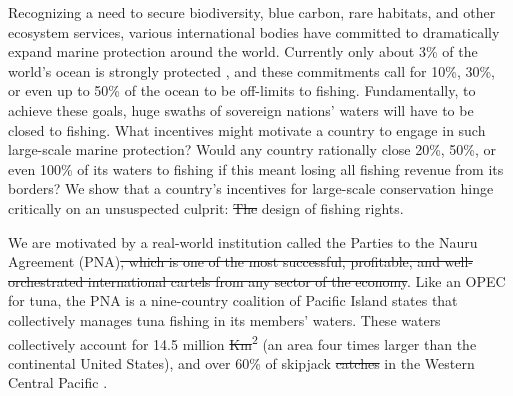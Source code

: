 \documentclass[12pt]{article}
\providecommand{\DIFaddtex}[1]{{\protect\color{blue}\uwave{#1}}} %
\providecommand{\DIFdeltex}[1]{{\protect\color{red}\sout{#1}}}                      %
\providecommand{\DIFaddbegin}{} %
\providecommand{\DIFaddend}{} %
\providecommand{\DIFdelbegin}{} %
\providecommand{\DIFdelend}{} %
\providecommand{\DIFadd}[1]{\texorpdfstring{\DIFaddtex{#1}}{#1}} %
\providecommand{\DIFdel}[1]{\texorpdfstring{\DIFdeltex{#1}}{}} %
\newcommand{\DIFscaledelfig}{0.5}
\newlength{\DIFdelgraphicswidth} %
\newlength{\DIFdelgraphicsheight} %
\newcommand{\DIFaddincludegraphics}[2][]{{\color{blue}\fbox{\DIFOincludegraphics[#1]{#2}}}} %
\newcommand{\DIFdelincludegraphics}[2][]{%
\sbox{\DIFdelgraphicsbox}{\DIFOincludegraphics[#1]{#2}}%
\settoboxwidth{\DIFdelgraphicswidth}{\DIFdelgraphicsbox} %
\settoboxtotalheight{\DIFdelgraphicsheight}{\DIFdelgraphicsbox} %
\scalebox{\DIFscaledelfig}{%
\parbox[b]{\DIFdelgraphicswidth}{\usebox{\DIFdelgraphicsbox}\\[-\baselineskip] \rule{\DIFdelgraphicswidth}{0em}}\llap{\resizebox{\DIFdelgraphicswidth}{\DIFdelgraphicsheight}{%
\setlength{\unitlength}{\DIFdelgraphicswidth}%
\begin{picture}(1,1)%
\thicklines\linethickness{2pt} %
{\color[rgb]{1,0,0}\put(0,0){\framebox(1,1){}}}%
{\color[rgb]{1,0,0}\put(0,0){\line( 1,1){1}}}%
{\color[rgb]{1,0,0}\put(0,1){\line(1,-1){1}}}%
\end{picture}%
}\hspace*{3pt}}} %
} %
\DeclareRobustCommand{\DIFaddbegin}{\DIFOaddbegin \let\includegraphics\DIFaddincludegraphics} %
\DeclareRobustCommand{\DIFaddend}{\DIFOaddend \let\includegraphics\DIFOincludegraphics} %
\DeclareRobustCommand{\DIFdelbegin}{\DIFOdelbegin \let\includegraphics\DIFdelincludegraphics} %
\DeclareRobustCommand{\DIFdelend}{\DIFOaddend \let\includegraphics\DIFOincludegraphics} %
\begin{document}





Recognizing a need to secure biodiversity, blue carbon, rare habitats, and other ecosystem services, various international bodies have committed to dramatically expand marine protection around the world. Currently only about 3\% of the world's ocean is strongly protected \cite{sala_2018}, and these commitments call for 10\%, 30\%, or even up to 50\% of the ocean to be off-limits to fishing. Fundamentally, to achieve these goals, huge swaths of sovereign nations' waters will have to be closed to fishing. What incentives might motivate a country to engage in such large-scale marine protection? Would any country rationally close 20\%, 50\%, or even 100\% of its waters to fishing if this meant losing all fishing revenue from \DIFaddbegin \DIFadd{within }\DIFaddend its borders? We show that a country's incentives for large-scale conservation hinge critically on an unsuspected culprit: \DIFdelbegin \DIFdel{The }\DIFdelend \DIFaddbegin \DIFadd{the }\DIFaddend design of fishing rights.

We are motivated by a real-world institution called the Parties to the Nauru Agreement (PNA)\DIFdelbegin \DIFdel{, which is one of the most successful, profitable, and well-orchestrated international cartels from any sector of the economy}\DIFdelend . Like an OPEC for tuna, the PNA is a nine-country coalition of Pacific Island states that collectively manages tuna fishing in its members' waters\cite{havice_2013,aqorau_2018}. These waters collectively account for 14.5 million \DIFdelbegin \DIFdel{Km}\DIFdelend \DIFaddbegin \DIFadd{km}\DIFaddend \textsuperscript{2} (an area four times larger than the continental United States), and over 60\% of skipjack \DIFdelbegin \DIFdel{catches }\DIFdelend \DIFaddbegin \DIFadd{tuna catch }\DIFaddend in the Western Central Pacific \cite{havice_2013}.
\end{document}
